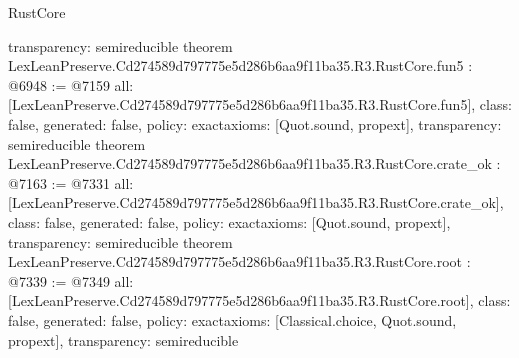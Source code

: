 \begin{lexlean}{RustCore}
\begin{coremodule}
{  transparency: semireducible
}
theorem LexLeanPreserve.Cd274589d797775e5d286b6aa9f11ba35.R3.RustCore.fun5 : @6948 := @7159 {
  all: [LexLeanPreserve.Cd274589d797775e5d286b6aa9f11ba35.R3.RustCore.fun5],
  class: false,
  generated: false,
  policy: exact{axioms: [Quot.sound, propext]},
  transparency: semireducible
}
theorem LexLeanPreserve.Cd274589d797775e5d286b6aa9f11ba35.R3.RustCore.crate_ok : @7163 := @7331 {
  all: [LexLeanPreserve.Cd274589d797775e5d286b6aa9f11ba35.R3.RustCore.crate_ok],
  class: false,
  generated: false,
  policy: exact{axioms: [Quot.sound, propext]},
  transparency: semireducible
}
theorem LexLeanPreserve.Cd274589d797775e5d286b6aa9f11ba35.R3.RustCore.root : @7339 := @7349 {
  all: [LexLeanPreserve.Cd274589d797775e5d286b6aa9f11ba35.R3.RustCore.root],
  class: false,
  generated: false,
  policy: exact{axioms: [Classical.choice, Quot.sound, propext]},
  transparency: semireducible
}


\end{coremodule}
\end{lexlean}
